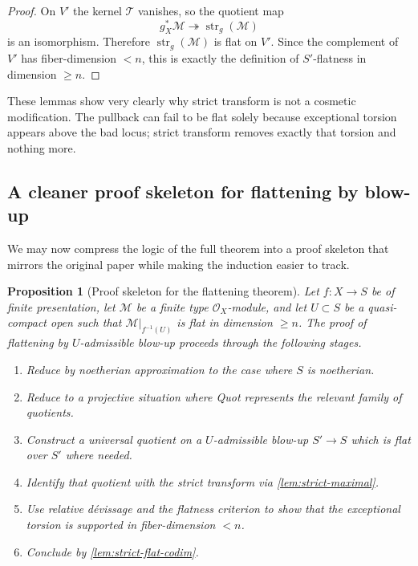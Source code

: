 \documentclass[11pt,oneside]{article}
\newtheorem{proposition}[theorem]{Proposition}
\newcommand{\M}{\mathcal M}
\newcommand{\OO}{\mathcal O}
\newcommand{\Tcal}{\mathcal T}
\newcommand{\st}{\operatorname{str}}
\begin{document}
\begin{proof}
On $V'$ the kernel $\Tcal$ vanishes, so the quotient map
\[
g_X^*\M\twoheadrightarrow \st_g(\M)
\]
is an isomorphism.  Therefore $\st_g(\M)$ is flat on $V'$.  Since the complement of $V'$ has fiber-dimension $<n$, this is exactly the definition of $S'$-flatness in dimension $\ge n$.
\end{proof}

These lemmas show very clearly why strict transform is not a cosmetic modification.  The pullback can fail to be flat solely because exceptional torsion appears above the bad locus; strict transform removes exactly that torsion and nothing more.

\subsection{A cleaner proof skeleton for flattening by blow-up}

We may now compress the logic of the full theorem into a proof skeleton that mirrors the original paper while making the induction easier to track.

\begin{proposition}[Proof skeleton for the flattening theorem]\label{prop:blowup-skeleton}
Let $f\colon X\to S$ be of finite presentation, let $\M$ be a finite type $\OO_X$-module, and let $U\subset S$ be a quasi-compact open such that $\M|_{f^{-1}(U)}$ is flat in dimension $\ge n$.  The proof of flattening by $U$-admissible blow-up proceeds through the following stages.
\begin{enumerate}[label=\textup{(\arabic*)}]
  \item Reduce by noetherian approximation to the case where $S$ is noetherian.
  \item Reduce to a projective situation where Quot represents the relevant family of quotients.
  \item Construct a universal quotient on a $U$-admissible blow-up $S'\to S$ which is flat over $S'$ where needed.
  \item Identify that quotient with the strict transform via \cref{lem:strict-maximal}.
  \item Use relative d\'evissage and the flatness criterion to show that the exceptional torsion is supported in fiber-dimension $<n$.
  \item Conclude by \cref{lem:strict-flat-codim}.
\end{enumerate}
\end{proposition}
\end{document}
